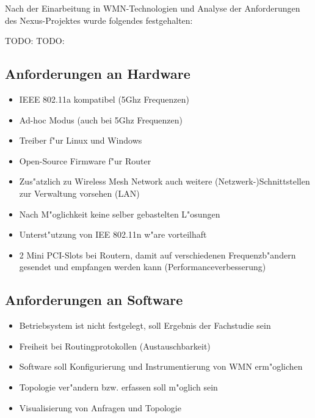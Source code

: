 Nach der Einarbeitung in WMN-Technologien und 
Analyse der Anforderungen des Nexus-Projektes
wurde folgendes festgehalten:

TODO: 
TODO: 
\subsection{Anforderungen an Hardware}
\begin{itemize}
	\item IEEE 802.11a kompatibel (5Ghz Frequenzen) 
	\item Ad-hoc Modus (auch bei 5Ghz Frequenzen) 
	\item Treiber f"ur Linux und Windows
	\item Open-Source Firmware f"ur Router
	\item Zus"atzlich zu Wireless Mesh Network auch weitere
	(Netzwerk-)Schnittstellen zur Verwaltung vorsehen (LAN)
	\item Nach M"oglichkeit keine selber gebastelten L"osungen 
	\item Unterst"utzung von IEE 802.11n w"are vorteilhaft
	\item 2 Mini PCI-Slots bei Routern, damit auf verschiedenen
	Frequenzb"andern gesendet und empfangen werden kann
	(Performanceverbesserung) 
\end{itemize}

\subsection{Anforderungen an Software}
\begin{itemize}
	\item Betriebsystem ist nicht festgelegt,
	soll Ergebnis der Fachstudie sein
	\item Freiheit bei Routingprotokollen (Austauschbarkeit)
	\item Software soll Konfigurierung und Instrumentierung von WMN
	erm"oglichen
	\item Topologie ver"andern bzw. erfassen soll m"oglich sein
	\item Visualisierung von Anfragen und Topologie 
\end{itemize}

